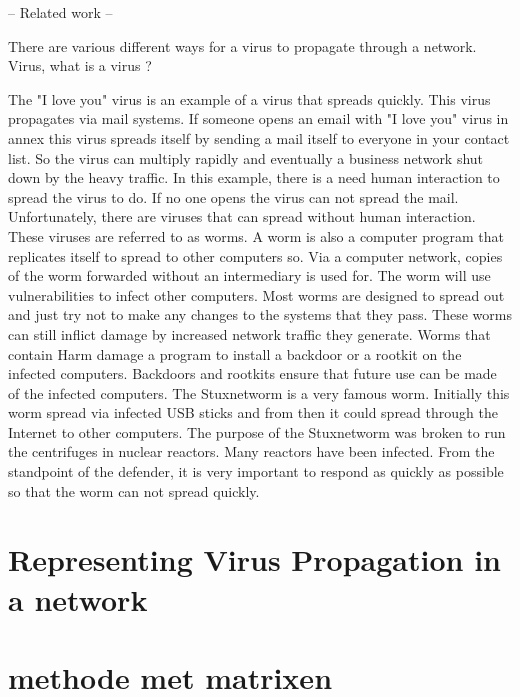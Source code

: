 -- Related work --

There are various different ways for a virus to propagate through a network.
Virus, what is a virus ?

The "I love you" virus is an example of a virus that spreads quickly. This virus propagates via mail systems. If someone opens an email with "I love you" virus in annex this virus spreads itself by sending a mail itself to everyone in your contact list. So the virus can multiply rapidly and eventually a business network shut down by the heavy traffic. In this example, there is a need human interaction to spread the virus to do. If no one opens the virus can not spread the mail.
Unfortunately, there are viruses that can spread without human interaction. These viruses are referred to as worms. A worm is also a computer program that replicates itself to spread to other computers so. Via a computer network, copies of the worm forwarded without an intermediary is used for. The worm will use vulnerabilities to infect other computers.
Most worms are designed to spread out and just try not to make any changes to the systems that they pass. These worms can still inflict damage by increased network traffic they generate. Worms that contain Harm damage a program to install a backdoor or a rootkit on the infected computers. Backdoors and rootkits ensure that future use can be made of the infected computers.
The Stuxnetworm is a very famous worm. Initially this worm spread via infected USB sticks and from then it could spread through the Internet to other computers. The purpose of the Stuxnetworm was broken to run the centrifuges in nuclear reactors. Many reactors have been infected. From the standpoint of the defender, it is very important to respond as quickly as possible so that the worm can not spread quickly.
\section{Representing Virus Propagation in a network}



\section{methode met matrixen}


